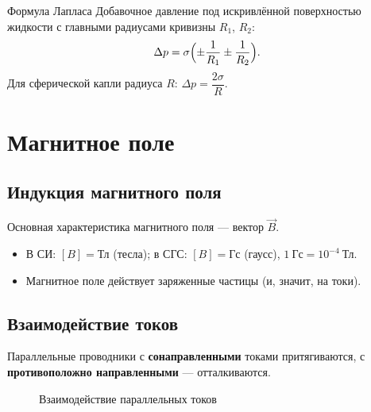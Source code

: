 \documentclass[11pt,a4paper]{article}
\begin{document}
\begin{kvb}{Формула Лапласа}
Добавочное давление под искривлённой поверхностью жидкости с главными радиусами кривизны $R_1$, $R_2$:
\[
\Delta p=\sigma\Bigl(\pm\frac1{R_1}\pm\frac1{R_2}\Bigr).
\]
Для сферической капли радиуса $R$: $\Delta p=\dfrac{2\sigma}R$.
\end{kvb}

\section{Магнитное поле}

\subsection{Индукция магнитного поля}
Основная характеристика магнитного поля — вектор  $\vec B$.
\begin{itemize}
\item В СИ: $[B]=\text{Тл}$ (тесла); в СГС: $[B]=\text{Гс}$ (гаусс), $1\ \text{Гс}=10^{-4}\ \text{Тл}$.
\item Магнитное поле действует  заряженные частицы (и, значит, на токи).
\end{itemize}

\subsection{Взаимодействие токов}
Параллельные проводники с \textbf{сонаправленными} токами притягиваются, с \textbf{противоположно направленными} — отталкиваются.

\begin{figure}[H]
\centering
{}
\caption{Взаимодействие параллельных токов}
\end{figure}
\end{document}
